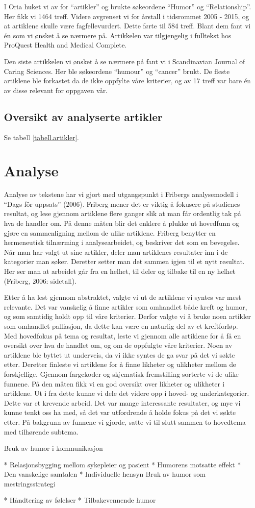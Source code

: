 I Oria huket vi av for “artikler” og brukte søkeordene “Humor” og
“Relationship”. Her fikk vi 1464 treff. Videre avgrenset vi for årstall i
tidsrommet 2005 - 2015, og at artiklene skulle være fagfellevurdert. Dette
førte til 584 treff. Blant dem fant vi én som vi ønsket å se nærmere på.
Artikkelen var tilgjengelig i fulltekst hos ProQuest Health and Medical
Complete.

Den siste artikkelen vi ønsket å se nærmere på fant vi i Scandinavian Journal
of Caring Sciences. Her ble søkeordene “humour” og “cancer” brukt. De fleste
artiklene ble forkastet da de ikke oppfylte våre kriterier, og av 17 treff var
bare én av disse relevant for oppgaven vår.

\subsection{Oversikt av analyserte artikler}

Se tabell \vref{tabell.artikler}.



\section{Analyse}

Analyse av tekstene har vi gjort med utgangspunkt i Fribergs analysemodell i
“Dags för uppsats” (2006). Friberg mener det er viktig å fokusere på studienes
resultat, og lese gjennom artiklene flere ganger slik at man får ordentlig tak
på hva de handler om. På denne måten blir det enklere å plukke ut hovedfunn og
gjøre en sammenligning mellom de ulike artiklene. Friberg benytter en
hermeneutisk tilnærming i analysearbeidet, og beskriver det som en bevegelse.
Når man har valgt ut sine artikler, deler man artiklenes resultater inn i de
kategorier man søker. Deretter setter man det sammen igjen til et nytt
resultat. Her ser man at arbeidet går fra en helhet, til deler og tilbake til
en ny helhet (Friberg, 2006: sidetall).

Etter å ha lest gjennom abstraktet, valgte vi ut de artiklene vi syntes var
mest relevante. Det var vanskelig å finne artikler som omhandlet både kreft og
humor, og som samtidig holdt opp til våre kriterier. Derfor valgte vi å bruke
noen artikler som omhandlet palliasjon, da dette kan være en naturlig del av et
kreftforløp. Med hovedfokus på tema og resultat, leste vi gjennom alle
artiklene for å få en oversikt over hva de handlet om, og om de oppfulgte våre
kriterier. Noen av artiklene ble byttet ut underveis, da vi ikke syntes de ga
svar på det vi søkte etter. Deretter finleste vi artiklene for å finne likheter
og ulikheter mellom de forskjellige. Gjennom fargekoder og skjematisk
fremstilling sorterte vi de ulike funnene. På den måten fikk vi en god oversikt
over likheter og ulikheter i artiklene. Ut i fra dette kunne vi dele det videre
opp i hoved- og underkategorier. Dette var et krevende arbeid. Det var mange
interessante resultater, og mye vi kunne tenkt oss ha med, så det var
utfordrende å holde fokus på det vi søkte etter. På bakgrunn av funnene vi
gjorde, satte vi til slutt sammen to hovedtema med tilhørende  subtema.

Bruk av humor i kommunikasjon

	* Relasjonsbygging mellom sykepleier og pasient
* Humorens motsatte effekt
* Den vanskelige samtalen
* Individuelle hensyn
	Bruk av humor som mestringsstrategi

	*  Håndtering av følelser
*  Tilbakevennende humor


